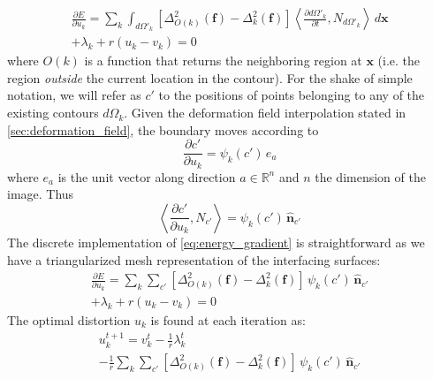 \begin{multline}
\frac{\partial E}{\partial u_k} = \sum\limits_k \int_{d\Omega'_k} \left[ \Delta^2_{O(k)} (\mathbf{f}) - \Delta^2_k (\mathbf{f}) \right]
\left\langle\frac{\partial{d\Omega'_k}}{\partial t}, N_{d\Omega'_k}\right\rangle \,d\mathbf{x} \\
+ \lambda_k + r(u_k - v_k) = 0
\label{eq:energy_gradient}
\end{multline}
where $O(k)$ is a function that returns the neighboring region at $\mathbf{x}$ (i.e.
the region \emph{outside} the current location in the contour). For the shake of
simple notation, we will refer as $c'$ to the positions of points belonging to
any of the existing contours $d\Omega_k$.
Given the deformation field interpolation stated in \autoref{sec:deformation_field}, 
the boundary moves according to
\begin{equation}
\frac{\partial c'}{\partial u_k} = \psi_k(c')\,e_a
\end{equation}
where $e_a$ is the unit vector along direction $a \in \mathbb{R}^n$ and $n$ the dimension
of the image. Thus
\begin{equation}
\left\langle\frac{\partial c'}{\partial u_k}, N_{c'}\right\rangle = \psi_k(c')\,\hat{\mathbf{n}}_{c'}
\end{equation}
The discrete implementation of \eqref{eq:energy_gradient} is straightforward as
we have a triangularized mesh representation of the interfacing surfaces:
\begin{multline}
\frac{\partial E}{\partial u_k} = \sum\limits_k \sum\limits_{c'} \left[ \Delta^2_{O(k)} (\mathbf{f}) - \Delta^2_k (\mathbf{f}) \right]
\, \psi_k(c')\,\hat{\mathbf{n}}_{c'} \\
+ \lambda_k + r(u_k - v_k) = 0
\label{eq:discrete_energy_gradient}
\end{multline}
The optimal distortion $u_k$ is found at each iteration as:
\begin{multline}
u_k^{t+1} = v_k^t - \frac{1}{r}\lambda_k^{t} \\
- \frac{1}{r} \sum\limits_k \sum\limits_{c'} \left[ \Delta^2_{O(k)} (\mathbf{f}) - \Delta^2_k (\mathbf{f}) \right]
\, \psi_k(c')\,\hat{\mathbf{n}}_{c'}
\label{eq:update_u}
\end{multline}


